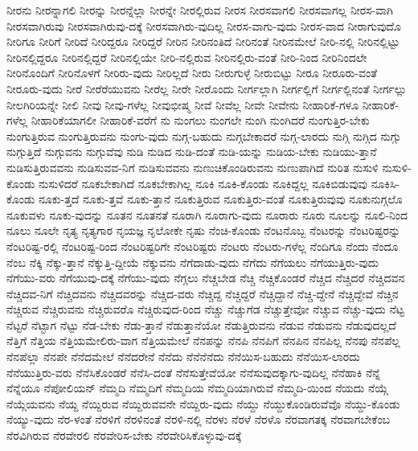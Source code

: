 {ನೀರನು
ನೀರನ್ನಾಗಲಿ
ನೀರನ್ನು
ನೀರನ್ನೆಲ್ಲಾ
ನೀರನ್ನೇ
ನೀರಲ್ಲಿರುವ
ನೀರಸ
ನೀರಸವಾಗಲಿ
ನೀರಸವಾಗಲ್ಲ
ನೀರಸ-ವಾಗಿ
ನೀರಸವಾಗಿರುವು
ನೀರಸವಾಗಿರುವು-ದಕ್ಕೆ
ನೀರಸವಾಗಿರು-ವುದಿಲ್ಲ
ನೀರಸ-ವಾಗು-ವುದು
ನೀರಸ-ವಾದ
ನೀರಾಗುವುದೊ
ನೀರಿಗೂ
ನೀರಿಗೆ
ನೀರಿದೆ
ನೀರಿದ್ದರೂ
ನೀರಿದ್ದರೆ
ನೀರಿನ
ನೀರಿನಂತಿದೆ
ನೀರಿನಂತೆ
ನೀರಿನಮೇಲೆ
ನೀರಿ-ನಲ್ಲಿ
ನೀರಿನಲ್ಲಿಟ್ಟು
ನೀರಿನಲ್ಲಿದ್ದರೂ
ನೀರಿನಲ್ಲಿದ್ದರೆ
ನೀರಿನಲ್ಲಿಯೇ
ನೀರಿ-ನಲ್ಲಿರುವ
ನೀರಿನಲ್ಲಿರು-ವಂತೆ
ನೀರಿ-ನಿಂದ
ನೀರಿನಿಂದಲೇ
ನೀರಿನೊಂದಿಗೆ
ನೀರಿನೊಳಗೆ
ನೀರಿರು-ವುದು
ನೀರಿಲ್ಲದೆ
ನೀರು
ನೀರುಗುಳ್ಳೆ
ನೀರುಬಿಟ್ಟು
ನೀರೂ
ನೀರೂರು-ವಂತೆ
ನೀರೂರು-ವುದು
ನೀರೆ
ನೀರೆರೆಯುವನು
ನೀರೆಲ್ಲ
ನೀರೇ
ನೀರೊಂದು
ನೀರ್ಗಲ್ಲಾಗಿ
ನೀರ್ಗಲ್ಲಿಗೆ
ನೀರ್ಗಲ್ಲಿನಂತೆ
ನೀರ್ಗಲ್ಲು
ನೀಲಗಿರಿಯನ್ನೇ
ನೀಲಿ
ನೀವು
ನೀವು-ಗಳೆಲ್ಲ
ನೀವುಭೀಷ್ಮ
ನೀವೆ
ನೀವೆಲ್ಲ
ನೀವೇ
ನೀವೇನು
ನೀಹಾರಿಕೆ-ಗಳೂ
ನೀಹಾರಿಕೆ-ಗಳೆಲ್ಲ
ನೀಹಾರಿಕೆಯಾಗಲೀ
ನೀಹಾರಿಕೆ-ವರೆಗೆ
ನು
ನುಂಗಲು
ನುಂಗಲೇ
ನುಂಗಿ
ನುಂಗಿದರೆ
ನುಂಗುತ್ತಿರ-ಬೇಕು
ನುಂಗುತ್ತಿರುವ
ನುಂಗುತ್ತಿರುವನು
ನುಂಗು-ವುದು
ನುಗ್ಗ-ಬಹುದು
ನುಗ್ಗಬೇಕಾದರೆ
ನುಗ್ಗ-ಲಾರದು
ನುಗ್ಗಿ
ನುಗ್ಗಿದ
ನುಗ್ಗು
ನುಗ್ಗುತ್ತಿದೆ
ನುಗ್ಗುವನು
ನುಗ್ಗುವೆವು
ನುಡಿ
ನುಡಿದ
ನುಡಿ-ದಂತೆ
ನುಡಿ-ಯನ್ನು
ನುಡಿಯ-ಬೇಕು
ನುಡಿಯು-ತ್ತಾನೆ
ನುಡಿಸುತ್ತಿರುವವನು
ನುಡಿಸುವವ-ನಿಗೆ
ನುಡಿಸುವವನು
ನುಣುಚಿಕೊಂಡಿರುವನು
ನುಣುಪಾಗಿದೆ
ನುರಿತ
ನುಸುಳಿ
ನುಸುಳಿ-ಕೊಂಡು
ನುಸುಳಿದರೆ
ನೂಕಬೇಕಾಗಿದೆ
ನೂಕಬೇಕಾಗಿಲ್ಲ
ನೂಕಿ
ನೂಕಿ-ಕೊಂಡು
ನೂಕಿದ್ದಲ್ಲ
ನೂಕಿಬಿಡುವುವು
ನೂಕಿಸಿ-ಕೊಂಡು
ನೂಕು-ತ್ತದೆ
ನೂಕು-ತ್ತವೆ
ನೂಕು-ತ್ತಾನೆ
ನೂಕುತ್ತಿರುವ
ನೂಕುತ್ತಿರು-ವಂತೆ
ನೂಕುತ್ತಿರುವುವು
ನೂಕುನುಗ್ಗಲೊ
ನೂಕುವಳು
ನೂಕು-ವುದನ್ನು
ನೂತನ
ನೂತನತೆ
ನೂರಾಗಿ
ನೂರಾಗು-ವುದು
ನೂರಾರು
ನೂರು
ನೂಲನ್ನು
ನೂಲಿ-ನಿಂದ
ನೂಲು
ನೂಲೇ
ನೃತ್ಯ
ನೃತ್ಯಗಾರ
ನೃಯಜ್ಞ
ನೃಲೋಕೇ
ನೃಷು
ನೆಂಚಿ-ಕೊಂಡು
ನೆಂಟನೊಬ್ಬ
ನೆಂಟರನ್ನು
ನೆಂಟರಿಷ್ಟರನ್ನು
ನೆಂಟರಿಷ್ಟ-ರಲ್ಲಿ
ನೆಂಟರಿಷ್ಟ-ರಿಂದ
ನೆಂಟರಿಷ್ಟರಿಗೇ
ನೆಂಟರಿಷ್ಟರು
ನೆಂಟರು
ನೆಂಟರು-ಗಳೆಲ್ಲ
ನೆಂದಿಗೂ
ನೆಂದು
ನೆಂದೂ
ನೆಂಬ
ನೆಕ್ಕಿ
ನೆಕ್ಕು-ತ್ತಾನೆ
ನೆಕ್ಕುತ್ತಿ-ದ್ದೀಯೆ
ನೆಕ್ಕುವನು
ನೆಗೆದಾಡು-ವುದು
ನೆಗೆದು
ನೆಗೆಯಲು
ನೆಗೆಯುತ್ತಿರು-ವುದು
ನೆಗೆಯು-ವರು
ನೆಗೆಯುವು-ದಕ್ಕೆ
ನೆಗೆಯು-ವುದು
ನೆಗ್ಗಲು
ನೆಚ್ಚಬೇಡ
ನೆಚ್ಚಿ
ನೆಚ್ಚಿಕೊಂಡರೆ
ನೆಚ್ಚಿದ
ನೆಚ್ಚಿದರೆ
ನೆಚ್ಚಿದವನ
ನೆಚ್ಚಿದವ-ನಿಗೆ
ನೆಚ್ಚಿದವನು
ನೆಚ್ಚಿದವರನ್ನು
ನೆಚ್ಚಿದ-ವರು
ನೆಚ್ಚಿದ್ದ
ನೆಚ್ಚಿದ್ದರೆ
ನೆಚ್ಚಿದ್ದಾನೆ
ನೆಚ್ಚಿ-ದ್ದೇನೆ
ನೆಚ್ಚಿದ್ದೇವೆ
ನೆಚ್ಚಿನ
ನೆಚ್ಚಿರುವ
ನೆಚ್ಚಿರುವನು
ನೆಚ್ಚಿರುವರೊ
ನೆಚ್ಚಿರುವುದ-ರಿಂದ
ನೆಚ್ಚು
ನೆಚ್ಚುಗೆಡ
ನೆಚ್ಚುತ್ತೇವೋ
ನೆಚ್ಚುವ
ನೆಚ್ಚು-ವುದು
ನೆಟ್ಟ
ನೆಟ್ಟರೆ
ನೆಟ್ಟಾಗ
ನೆಟ್ಟು
ನೆಡ-ಬೇಕು
ನೆಡು-ತ್ತಾನೆ
ನೆಡುತ್ತಾನೆಯೋ
ನೆಡುತ್ತಿರುವನು
ನೆಡುವ
ನೆಡುವನು
ನೆಡುವುದಲ್ಲದೆ
ನೆತ್ತಿಗೆ
ನೆತ್ತಿಯ
ನೆತ್ತಿಯಮೇಲಿರು-ವಾಗ
ನೆತ್ತಿಯಮೇಲೆ
ನೆನಪನ್ನು
ನೆನಪಿ
ನೆನಪಿಗೆ
ನೆನಪಿನ
ನೆನಪಿಲ್ಲ
ನೆನಪು
ನೆನಪೆಲ್ಲ
ನೆನಪೆಲ್ಲಾ
ನೆನಪೇ
ನೆನೆದಮೇಲೆ
ನೆನೆದರೇನೆ
ನೆನೆದು
ನೆನೆನೆನೆದು
ನೆನೆಯಿಸ-ಬಹುದು
ನೆನೆಯಿಸ-ಲಾರದು
ನೆನೆಯುತ್ತಿರು-ವರು
ನೆನೆಸಿಕೊಂಡರೆ
ನೆನೆಸಿ-ದಂತೆ
ನೆನೆಸುತ್ತೇವೆಯೋ
ನೆನೆಸುವುದಕ್ಕಾಗು-ವುದಿಲ್ಲ
ನೆನೆಹಾಕಿ
ನೆನ್ನೆ
ನೆನ್ನೆಯೂ
ನೆಪೋಲಿಯನ್
ನೆಮ್ಮದಿ
ನೆಮ್ಮದಿಗೆ
ನೆಮ್ಮದಿಯ
ನೆಮ್ಮದಿಯಾಗಿರುವೆ
ನೆಮ್ಮದಿ-ಯಿಂದ
ನೆಯದು
ನೆಯ್ಗೆ
ನೆಯ್ಗೆಯವನು
ನೆಯ್ದ
ನೆಯ್ದಿರುವ
ನೆಯ್ದಿರುವವನೇ
ನೆಯ್ದಿರು-ವುದು
ನೆಯ್ದು
ನೆಯ್ದುಕೊಂಡಿರುವೆವೊ
ನೆಯ್ದು-ಕೊಂಡು
ನೆಯ್ಯು-ವುದು
ನೆರ-ಳಂತೆ
ನೆರಳಿಗೆ
ನೆರಳಿನಂತೆ
ನೆರಳಿ-ನಲ್ಲಿ
ನೆರಳು
ನೆರಳೆ
ನೆರಳೊ
ನೆರವಾಗತಕ್ಕ
ನೆರವಾಗಬೇಕೆಂಬ
ನೆರವಿಗಿರುವ
ನೆರವೇರಲಿ
ನೆರವೇರಿಸ-ಬೇಕು
ನೆರವೇರಿಸಿಕೊಳ್ಳುವು-ದಕ್ಕೆ
}
